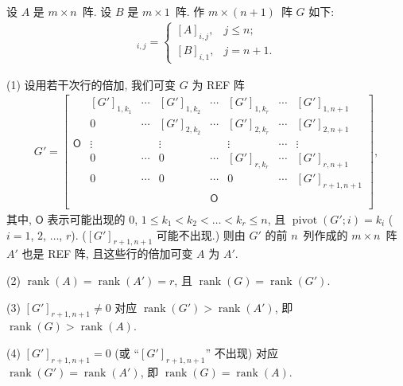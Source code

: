 \documentclass[../libro.tex]{subfiles}
\begin{document}
\begin{theorem}
    设 \(A\) 是 \(m \times n\)~阵.
    设 \(B\) 是 \(m \times 1\)~阵.
    作 \(m \times (n + 1)\)~阵 \(G\) 如下:
    \begin{align*}
        [G]_{i,j} =
        \begin{cases}
            [A]_{i,j}, & j \leq n;  \\
            [B]_{i,1}, & j = n + 1.
        \end{cases}
    \end{align*}

    (1)
    设用若干次行的倍加,
    我们可变 \(G\) 为 REF 阵
    \begin{align*}
        G' =
        \begin{bmatrix}
            {}         & [G']_{1,k_1} & \cdots & [G']_{1,k_2} & \cdots     & [G']_{1,k_r} & \cdots & [G']_{1,n+1}   \\
            {}         & 0            & \cdots & [G']_{2,k_2} & \cdots     & [G']_{2,k_r} & \cdots & [G']_{2,n+1}   \\
            \mathsf{O} & \vdots       & {}     & \vdots       & {}         & \vdots       & \cdots & \vdots         \\
            {}         & 0            & \cdots & 0            & \cdots     & [G']_{r,k_r} & \cdots & [G']_{r,n+1}   \\
            {}         & 0            & \cdots & 0            & \cdots     & 0            & \cdots & [G']_{r+1,n+1} \\
            {}         & {}           & {}     & {}           & \mathsf{O} & {}           & {}     & {}             \\
        \end{bmatrix},
    \end{align*}
    其中,
    \(\mathsf{O}\) 表示可能出现的 \(0\),
    \(1 \leq k_1 < k_2 < \dots < k_r \leq n\),
    且 \(\operatorname{pivot} {(G'; i)} = k_i\)
    (\(i = 1\), \(2\), \(\dots\), \(r\)).
    (\([G']_{r+1,n+1}\) 可能不出现.)
    则由 \(G'\) 的前 \(n\)~列作成的
    \(m \times n\)~阵 \(A'\)
    也是 REF 阵,
    且这些行的倍加可变 \(A\) 为 \(A'\).

    (2)
    \(\operatorname{rank} {(A)}
    = \operatorname{rank} {(A')} = r\),
    且
    \(\operatorname{rank} {(G)} = \operatorname{rank} {(G')}\).

    (3)
    \([G']_{r+1,n+1} \neq 0\) 对应
    \(\operatorname{rank} {(G')} > \operatorname{rank} {(A')}\),
    即
    \(\operatorname{rank} {(G)} > \operatorname{rank} {(A)}\).

    (4)
    \([G']_{r+1,n+1} = 0\)
    (或 ``\([G']_{r+1,n+1}\)'' 不出现) 对应
    \(\operatorname{rank} {(G')} = \operatorname{rank} {(A')}\),
    即
    \(\operatorname{rank} {(G)} = \operatorname{rank} {(A)}\).
\end{theorem}
\end{document}
